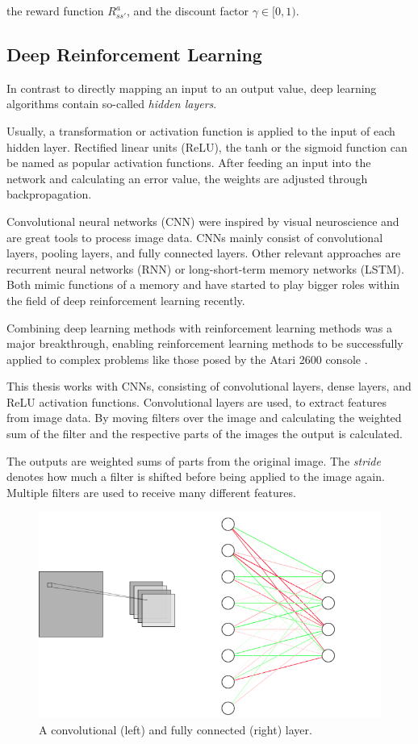 the reward function $R^a_{s s'}$,
and the discount factor $\gamma  \in [0,1)$.

\subsection{Deep Reinforcement Learning}
In contrast to directly mapping an input to an output value, deep learning algorithms contain so-called \textit{hidden layers}.


Usually, a transformation or activation function is applied to the input of each hidden layer. Rectified linear units (ReLU), the tanh or the sigmoid function can be named as popular activation functions.
After feeding an input into the network and calculating an error value, the weights are adjusted through backpropagation.

Convolutional neural networks (CNN) were inspired by visual neuroscience and are great tools to process image data. CNNs mainly consist of convolutional layers, pooling layers, and fully connected layers.
Other relevant approaches are recurrent neural networks (RNN) or long-short-term memory networks (LSTM). Both mimic functions of a memory and have started to play bigger roles within the field of deep reinforcement learning recently.

Combining deep learning methods with reinforcement learning methods was a major breakthrough, enabling reinforcement learning methods to be successfully applied to complex problems like those posed by the Atari 2600 console \citep{deeprlLi}.

This thesis works with CNNs, consisting of convolutional layers, dense layers, and ReLU activation functions.
\pagebreak
Convolutional layers are used, to extract features from image data. By moving filters over the image and calculating the weighted sum of the filter and the respective parts of the images the output is calculated. 

The outputs are weighted sums of parts from the original image.
The \textit{stride} denotes how much a filter is shifted before being applied to the image again. Multiple filters are used to receive many different features.

\begin{figure}
\includegraphics[scale=0.5]{bilder/deeplayers.png}
\caption{A convolutional (left) and fully connected (right) layer.
}
\label{networks}
\end{figure}

